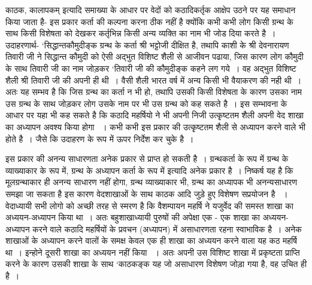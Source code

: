 {काठक, कालापकम् इत्यादि समाख्या के आधार पर वेदों को कठादिकर्तृक आक्षेप उठने पर यह समाधान किया जाता है- इस प्रकार कर्ता की कल्पना करना ठीक नहीं है क्योंकि कभी कभी लोग किसी ग्रन्थ के साथ किसी विशेषता को देखकर कर्तृभिन्न किसी अन्य व्यक्ति का नाम भी जोड दिया करते है~। उदाहरणार्थ- ‘सिद्धान्तकौमुदीङ्क ग्रन्थ के कर्ता श्री भट्टोजी दीक्षित है, तथापि काशी के श्री देवनारायण तिवारी जी ने सिद्धान्त कौमुदी को ऐसी अद्भुत विशिष्ट शैली से आजीवन पढाया, जिस कारण लोग कौमुदी के साथ तिवारी जी का नाम जोड़कर ‘तिवारी जी की कौमुदीङ्क कहने लग गये~। वह अद्भुत विशिष्ट शैली श्री तिवारी जी की अपनी ही थी~। वैसी शैली भारत वर्ष में अन्य किसी भी वैयाकरण की नही थी~। अतः यह सम्भव है कि जिस ग्रन्थ का कर्ता न भी हो, तथापि उसकी किसी विशेषता के कारण उसका नाम उस ग्रन्थ के साथ जोड़कर लोग उसके नाम पर भी उस ग्रन्थ को कह सकते है~। इस सम्भावना के आधार पर यहा भी कह सकते है कि कठादि महर्षियो ने भी अपनी निजी उत्कृृष्टतम शैली अपनी वेद शाखा का अध्यापन अवश्य किया होगा ~। कभी कभी इस प्रकार की उत्कृृष्टतम शैली से अध्यापन करने वाले भी होते है~। जैसे कि उदाहरण के रूप में ऊपर निर्देश कर चुके है~।  

इस प्रकार की अनन्य साधारणता अनेक प्रकार से प्राप्त हो सकती है~। ग्रन्थकर्ता के रूप में ग्रन्थ के व्याख्याकार के रूप में, ग्रन्थ के अध्यापन कर्ता के रूप में इत्यादि अनेक प्रकार है~। निष्कर्ष  यह है कि मूलग्रन्थाकार ही अनन्य साधारण नहीं होगा, ग्रन्थ व्याख्याकार भी, ग्रन्थ का अध्यापक भी अनन्यसाधारण समझा जा सकता है इस कारण वेदशाखाओं के साथ काठक आदि जुड़े हुए विशेषण सप्रयोजन है ~। वेदाध्यायी सभी लोगो को अच्छी तरह से स्मरण है कि वैशम्पायन महर्षि ने यजुर्वेद की समस्त शाखा का अध्ययन-अध्यापन किया था~। अतः बहुशाखाध्यायी पुरुषों की अपेक्षा एक - एक शाखा का अध्ययन-अध्यापन करने वाले कठादि महर्षियों के प्रवचन (अध्यापन) में असाधारणता रहना स्वाभाविक है~। अनेक शाखाओं के अध्यापन करने वालों के समक्ष केवल एक ही शाखा का अध्ययन करने वाला यह कठ महर्षि था~। इन्होने दूसरी शाखा का अध्ययन नहीं किया ~। अतः अपनी उस विशिष्ट शाखा में प्रकृष्टता प्राप्ति करने के कारण उसकी शाखा के साथ ‘काठकङ्क यह जो असाधारण विशेषण जोड़ा गया है, वह उचित ही है~। 

}
